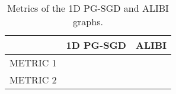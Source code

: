 \begin{table}[]
	\caption{Metrics of the 1D PG-SGD and ALIBI graphs.}
	\begin{tabular}{|l|l|l|}
		\hline
		& 1D PG-SGD & ALIBI \\ \hline
		METRIC 1 &           &       \\ \hline
		METRIC 2 &           &       \\ \hline
	\end{tabular}
\end{table}